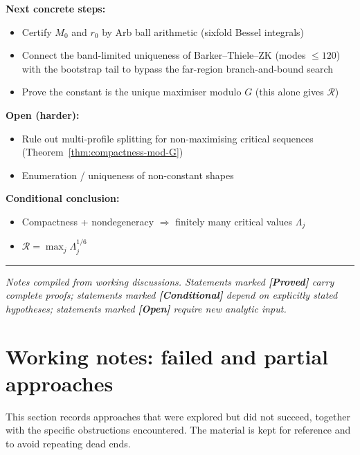\documentclass[12pt]{article}
\theoremstyle{definition}
\theoremstyle{remark}
\newcommand{\proven}{\textbf{\color{teal}[Proved]}}
\newcommand{\conditional}{\textbf{\color{orange}[Conditional]}}
\newcommand{\open}{\textbf{\color{red}[Open]}}
\begin{document}
\begin{center}
{{\textbf{Next concrete steps:}
\begin{itemize}[leftmargin=1.5em, topsep=2pt, itemsep=1pt]
  \item Certify $M_0$ and $r_0$ by Arb ball arithmetic
    (sixfold Bessel integrals)
  \item Connect the band-limited uniqueness of Barker--Thiele--ZK
    (modes $\leq 120$) with the bootstrap tail to bypass the far-region
    branch-and-bound search
  \item Prove the constant is the unique maximiser modulo $G$
    (this alone gives $\mathcal R$)
\end{itemize}

\textbf{Open (harder):}
\begin{itemize}[leftmargin=1.5em, topsep=2pt, itemsep=1pt]
  \item Rule out multi-profile splitting for non-maximising
    critical sequences (Theorem~\ref{thm:compactness-mod-G})
  \item Enumeration / uniqueness of non-constant shapes
\end{itemize}

\textbf{Conditional conclusion:}
\begin{itemize}[leftmargin=1.5em, topsep=2pt, itemsep=1pt]
  \item Compactness + nondegeneracy $\Longrightarrow$ finitely many
    critical values $\Lambda_j$
  \item $\mathcal R=\max_j\Lambda_j^{1/6}$
\end{itemize}
}}
\end{center}

\bigskip
\noindent\rule{\linewidth}{0.4pt}
\begin{center}
  \small\itshape
  Notes compiled from working discussions.  Statements marked \proven{}
  carry complete proofs; statements marked \conditional{} depend on
  explicitly stated hypotheses; statements marked \open{} require new
  analytic input.
\end{center}

\section{Working notes: failed and partial approaches}
\label{sec:working-notes}

This section records approaches that were explored but did not succeed,
together with the specific obstructions encountered.  The material is
kept for reference and to avoid repeating dead ends.
\end{document}
